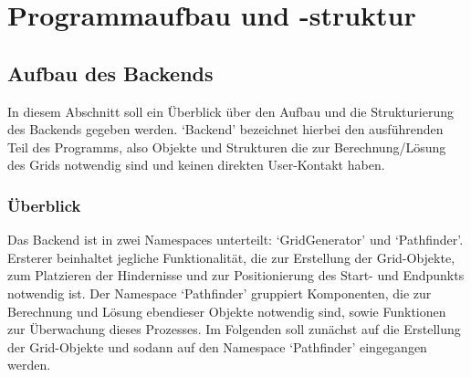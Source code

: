 \chapter{Programmaufbau und -struktur}
\label{ch:aufbau}

\section{Aufbau des Backends}
\label{sec:aufbau_backend}
In diesem Abschnitt soll ein Überblick über den Aufbau und die Strukturierung des Backends gegeben werden.
`Backend' bezeichnet hierbei den ausführenden Teil des Programms, also Objekte und Strukturen die zur Berechnung/Lösung des Grids notwendig sind und keinen direkten User-Kontakt haben.

\subsection{Überblick}
\label{subsec:aufbau_backend_ueberblick}
Das Backend ist in zwei Namespaces unterteilt: `GridGenerator' und `Pathfinder'.
Ersterer beinhaltet jegliche Funktionalität, die zur Erstellung der Grid-Objekte, zum Platzieren der Hindernisse und zur Positionierung des Start- und Endpunkts notwendig ist.
Der Namespace `Pathfinder' gruppiert Komponenten, die zur Berechnung und Lösung ebendieser Objekte notwendig sind, sowie Funktionen zur Überwachung dieses Prozesses.
Im Folgenden soll zunächst auf die Erstellung der Grid-Objekte und sodann auf den Namespace `Pathfinder' eingegangen werden.
